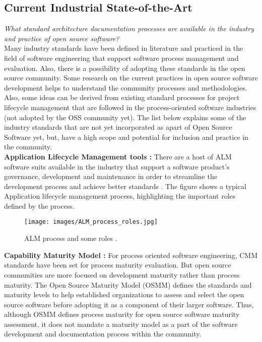 \subsection{Current Industrial State-of-the-Art}
\indent \emph{What standard architecture documentation processes are available in the industry and practice of open source software?}
\\\indent Many industry standards have been defined in literature and practiced in the field of software engineering that support software process management and evaluation. Also, there is a possibility of adopting these standards in the open source community. Some research on the current practices in open source software development helps to understand the community processes and methodologies. Also, some ideas can be derived from existing standard processes for project lifecycle management that are followed in the process-oriented software industries (not adopted by the OSS community yet). The list below explains some of the industry standards that are not yet incorporated as apart of Open Source Software yet, but, have a high scope and potential for inclusion and practice in the community.
\newline
\\\indent \textbf{Application Lifecycle Management tools : }  There are a host of ALM software suits available in the industry that support a software product's governance, development and maintenance in order to streamline the development process and achieve better standards \cite{ALM2009}. The figure shows a typical Application lifecycle management process, highlighting the important roles defined by the process.
\begin{figure}[H]
  \centering
  \texttt{[image: images/ALM\_process\_roles.jpg]}
  \caption[ALM process and roles \cite{ALM2009}]{ALM process and some roles \cite{ALM2009}.}\label{fig:ALM_process_roles}
\end{figure} 
\indent \textbf{Capability Maturity Model : }  For process oriented software engineering, CMM standards \cite{SCAMPITeam2013} have been set for process maturity evaluation. But open source communities are more focused on development maturity rather than process maturity. The Open Source Maturity Model (OSMM) \cite{Duijnhouwer2003} defines the standards and maturity levels to help established organizations to assess and select the open source software before adopting it as a component of their larger software. Thus, although OSMM defines process maturity for open source software maturity assessment, it does not mandate a maturity model as a part of the software development and documentation process within the community. 
